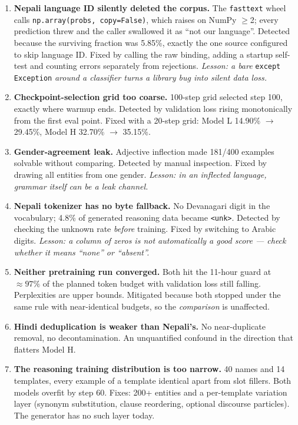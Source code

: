 \documentclass[11pt]{report}
\begin{document}
\begin{enumerate}
\item \textbf{Nepali language ID silently deleted the corpus.} The
\texttt{fasttext} wheel calls \texttt{np.array(probs, copy=False)}, which raises
on NumPy $\ge$2; every prediction threw and the caller swallowed it as ``not our
language''. Detected because the surviving fraction was 5.85\%, exactly the one
source configured to skip language ID. Fixed by calling the raw binding, adding
a startup self-test and counting errors separately from rejections.
\textit{Lesson: a bare} \texttt{except Exception} \textit{around a classifier
turns a library bug into silent data loss.}

\item \textbf{Checkpoint-selection grid too coarse.} 100-step grid selected step
100, exactly where warmup ends. Detected by validation loss rising
monotonically from the first eval point. Fixed with a 20-step grid: Model L
14.90\% $\rightarrow$ 29.45\%, Model H 32.70\% $\rightarrow$ 35.15\%.

\item \textbf{Gender-agreement leak.} Adjective inflection made 181/400 examples
solvable without comparing. Detected by manual inspection. Fixed by drawing all
entities from one gender. \textit{Lesson: in an inflected language, grammar
itself can be a leak channel.}

\item \textbf{Nepali tokenizer has no byte fallback.} No Devanagari digit in the
vocabulary; 4.8\% of generated reasoning data became \texttt{<unk>}. Detected by
checking the unknown rate \emph{before} training. Fixed by switching to Arabic
digits. \textit{Lesson: a column of zeros is not automatically a good score ---
check whether it means ``none'' or ``absent''.}

\item \textbf{Neither pretraining run converged.} Both hit the 11-hour guard at
${\approx}97\%$ of the planned token budget with validation loss still falling.
Perplexities are upper bounds. Mitigated because both stopped under the same
rule with near-identical budgets, so the \emph{comparison} is unaffected.

\item \textbf{Hindi deduplication is weaker than Nepali's.} No near-duplicate
removal, no decontamination. An unquantified confound in the direction that
flatters Model H.

\item \textbf{The reasoning training distribution is too narrow.} 40 names and
14 templates, every example of a template identical apart from slot fillers.
Both models overfit by step 60. Fixes: 200+ entities and a per-template
variation layer (synonym substitution, clause reordering, optional discourse
particles). The generator has no such layer today.


\end{enumerate}
\end{document}
